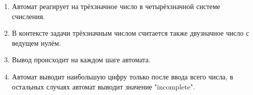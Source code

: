 

\begin{enumerate}

    \item Автомат реагирует на трёхзначное число в четырёхзначной системе
        счисления.

    \item В контексте задачи трёхзначным числом считается также
        двузначное число с ведущем нулём.

    \item Вывод происходит на каждом шаге автомата.

    \item Автомат выводит наибольшую цифру только после ввода всего
        числа, в остальных случаях автомат выводит значение "incomplete".

\end{enumerate}

